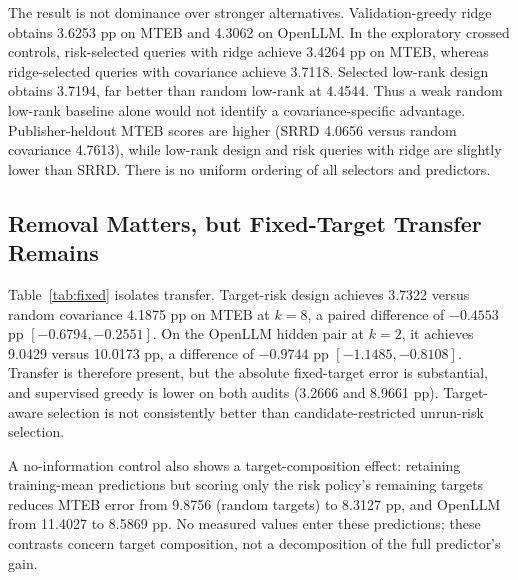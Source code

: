 \documentclass{article}
\begin{document}
The result is not dominance over stronger alternatives. Validation-greedy ridge obtains 3.6253 pp on MTEB and 4.3062 on OpenLLM. In the exploratory crossed controls, risk-selected queries with ridge achieve 3.4264 pp on MTEB, whereas ridge-selected queries with covariance achieve 3.7118. Selected low-rank design obtains 3.7194, far better than random low-rank at 4.4544. Thus a weak random low-rank baseline alone would not identify a covariance-specific advantage. Publisher-heldout MTEB scores are higher (SRRD 4.0656 versus random covariance 4.7613), while low-rank design and risk queries with ridge are slightly lower than SRRD. There is no uniform ordering of all selectors and predictors.

\subsection{Removal Matters, but Fixed-Target Transfer Remains}
\begin{table}[t]
\caption{Original seed-701 fixed-target audit on random/native splits. Entries are mean model RMSE (pp) [conditional 95\% interval]. The 12 MTEB targets or two OpenLLM targets remain hidden at every budget, and every method uses the same disjoint candidate pool. Low-rank risk design is exploratory. Scores are not directly subtractable from Table~\ref{tab:main} to estimate a causal removal fraction.}
\label{tab:fixed}
\centering

\end{table}

Table~\ref{tab:fixed} isolates transfer. Target-risk design achieves 3.7322 versus random covariance 4.1875 pp on MTEB at $k=8$, a paired difference of $-0.4553$ pp $[-0.6794,-0.2551]$. On the OpenLLM hidden pair at $k=2$, it achieves 9.0429 versus 10.0173 pp, a difference of $-0.9744$ pp $[-1.1485,-0.8108]$. Transfer is therefore present, but the absolute fixed-target error is substantial, and supervised greedy is lower on both audits (3.2666 and 8.9661 pp). Target-aware selection is not consistently better than candidate-restricted unrun-risk selection.

A no-information control also shows a target-composition effect: retaining training-mean predictions but scoring only the risk policy's remaining targets reduces MTEB error from 9.8756 (random targets) to 8.3127 pp, and OpenLLM from 11.4027 to 8.5869 pp. No measured values enter these predictions; these contrasts concern target composition, not a decomposition of the full predictor's gain.
\end{document}
